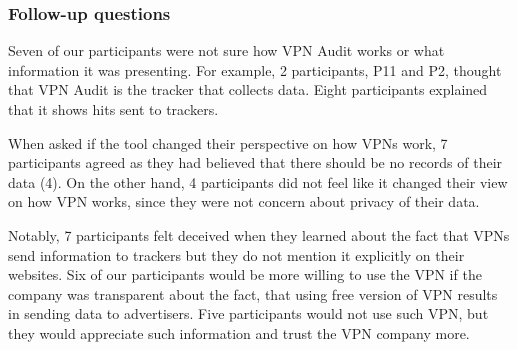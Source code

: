 \subsubsection{Follow-up questions} 

Seven of our participants were not sure how VPN Audit works or what information it was presenting. For example, 2 participants, P11 and P2, thought that VPN Audit is the tracker that collects data. Eight participants explained that it shows hits sent to trackers. 

When asked if the tool changed their perspective on how VPNs work, 7 participants agreed as they had believed that there should be no records of their data (4). On the other hand, 4 participants did not feel like it changed their view on how VPN works, since they were not concern about privacy of their data.

Notably, 7 participants felt deceived when they learned about the fact that VPNs send information to trackers but they do not mention it explicitly on their websites. Six of our participants would be more willing to use the VPN if the company was transparent about the fact, that using free version of VPN results in sending data to advertisers. Five participants would not use such VPN, but they would appreciate such information and trust the VPN company more. 



